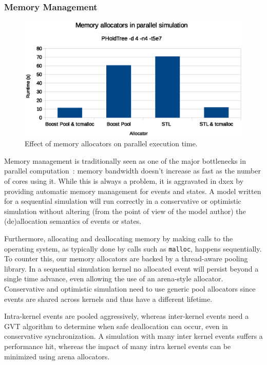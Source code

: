 \subsubsection{Memory Management}
\label{sec:4-subsec:overhead-pgraph:memory}
\begin{figure}
    \center
    \includegraphics[width=\columnwidth]{fig/memory_allocators_parallel.eps}
    \caption{Effect of memory allocators on parallel execution time.}
    \label{fig:memallocators_parallel}
\end{figure}
Memory management is traditionally seen as one of the major bottlenecks in parallel computation~\cite{WhatEveryComputerProgrammerShouldKnowAboutMemory}: memory bandwidth doesn't increase as fast as the number of cores using it.
While this is always a problem, it is aggravated in dxex by providing automatic memory management for events and states.
A model written for a sequential simulation will run correctly in a conservative or optimistic simulation without altering (from the point of view of the model author) the (de)allocation semantics of events or states.

Furthermore, allocating and deallocating memory by making calls to the operating system, as typically done by calls such as \texttt{malloc}, happens sequentially.
To counter this, our memory allocators are backed by a thread-aware pooling library.
In a sequential simulation kernel no allocated event will persist beyond a single time advance, even allowing the use of an arena-style allocator.
Conservative and optimistic simulation need to use generic pool allocators since events are shared across kernels and thus have a different lifetime.

Intra-kernel events are pooled aggressively, whereas inter-kernel events need a GVT algorithm to determine when safe deallocation can occur, even in conservative synchronization.
A simulation with many inter kernel events suffers a performance hit, whereas the impact of many intra kernel events can be minimized using arena allocators.

